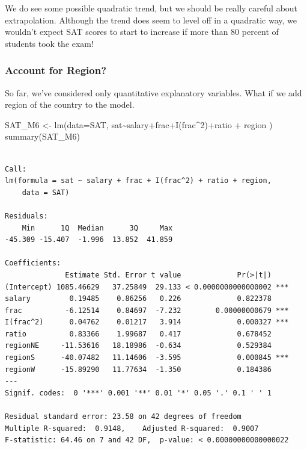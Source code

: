 \documentclass[
  letterpaper,
  DIV=11,
  numbers=noendperiod]{scrreprt}
\newenvironment{Shaded}{\begin{snugshade}}{\end{snugshade}}
\newcommand{\AttributeTok}[1]{\textcolor[rgb]{0.40,0.45,0.13}{#1}}
\newcommand{\DecValTok}[1]{\textcolor[rgb]{0.68,0.00,0.00}{#1}}
\newcommand{\FunctionTok}[1]{\textcolor[rgb]{0.28,0.35,0.67}{#1}}
\newcommand{\NormalTok}[1]{\textcolor[rgb]{0.00,0.23,0.31}{#1}}
\newcommand{\OtherTok}[1]{\textcolor[rgb]{0.00,0.23,0.31}{#1}}
\newcommand{\SpecialCharTok}[1]{\textcolor[rgb]{0.37,0.37,0.37}{#1}}
\begin{document}
We do see some possible quadratic trend, but we should be really careful
about extrapolation. Although the trend does seem to level off in a
quadratic way, we wouldn't expect SAT scores to start to increase if
more than 80 percent of students took the exam!

\subsubsection{Account for Region?}\label{account-for-region}

So far, we've considered only quantitative explanatory variables. What
if we add region of the country to the model.

\begin{Shaded}
\begin{Highlighting}[]
\NormalTok{SAT\_M6 }\OtherTok{\textless{}{-}} \FunctionTok{lm}\NormalTok{(}\AttributeTok{data=}\NormalTok{SAT, sat}\SpecialCharTok{\textasciitilde{}}\NormalTok{salary}\SpecialCharTok{+}\NormalTok{frac}\SpecialCharTok{+}\FunctionTok{I}\NormalTok{(frac}\SpecialCharTok{\^{}}\DecValTok{2}\NormalTok{)}\SpecialCharTok{+}\NormalTok{ratio }\SpecialCharTok{+}\NormalTok{ region )}
\FunctionTok{summary}\NormalTok{(SAT\_M6)}
\end{Highlighting}
\end{Shaded}

\begin{verbatim}

Call:
lm(formula = sat ~ salary + frac + I(frac^2) + ratio + region, 
    data = SAT)

Residuals:
    Min      1Q  Median      3Q     Max 
-45.309 -15.407  -1.996  13.852  41.859 

Coefficients:
              Estimate Std. Error t value             Pr(>|t|)    
(Intercept) 1085.46629   37.25849  29.133 < 0.0000000000000002 ***
salary         0.19485    0.86256   0.226             0.822378    
frac          -6.12514    0.84697  -7.232        0.00000000679 ***
I(frac^2)      0.04762    0.01217   3.914             0.000327 ***
ratio          0.83366    1.99687   0.417             0.678452    
regionNE     -11.53616   18.18986  -0.634             0.529384    
regionS      -40.07482   11.14606  -3.595             0.000845 ***
regionW      -15.89290   11.77634  -1.350             0.184386    
---
Signif. codes:  0 '***' 0.001 '**' 0.01 '*' 0.05 '.' 0.1 ' ' 1

Residual standard error: 23.58 on 42 degrees of freedom
Multiple R-squared:  0.9148,    Adjusted R-squared:  0.9007 
F-statistic: 64.46 on 7 and 42 DF,  p-value: < 0.00000000000000022
\end{verbatim}
\end{document}
